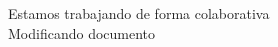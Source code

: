 \documentclass{article}
\begin{document}
Estamos trabajando de forma colaborativa\\
Modificando documento
\end{document}
